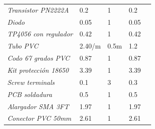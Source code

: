\documentclass[12pt]{article}
\begin{document}
\begin{table}[h!]
\begin{tabular}{l|l|l|l|l}
			\multicolumn{1}{|l|}{\textit{Transistor PN2222A}}               & 0.2                                                  & 1                                      & 0.2                                             &  \\ \cline{1-4}
			\multicolumn{1}{|l|}{\textit{Diodo}}                            & 0.05                                                 & 1                                      & 0.05                                            &  \\ \cline{1-4}
			\multicolumn{1}{|l|}{\textit{TP4056 con regulador}}             & 0.42                                                 & 1                                      & 0.42                                            &  \\ \cline{1-4}
			\multicolumn{1}{|l|}{\textit{Tubo PVC}}                         & 2.40/m                                               & 0.5m                                   & 1.2                                             &  \\ \cline{1-4}
			\multicolumn{1}{|l|}{\textit{Codo 67 grados PVC}}               & 0.87                                                 & 1                                      & 0.87                                            &  \\ \cline{1-4}
			\multicolumn{1}{|l|}{\textit{Kit protección 18650}}             & 3.39                                                 & 1                                      & 3.39                                            &  \\ \cline{1-4}
			\multicolumn{1}{|l|}{\textit{Screw terminals}}                  & 0.1                                                  & 3                                      & 0.3                                             &  \\ \cline{1-4}
			\multicolumn{1}{|l|}{\textit{PCB soldadura}}                    & 0.5                                                  & 1                                      & 0.5                                             &  \\ \cline{1-4}
			\multicolumn{1}{|l|}{\textit{Alargador SMA 3FT}}                & 1.97                                                 & 1                                      & 1.97                                            &  \\ \cline{1-4}
			\multicolumn{1}{|l|}{\textit{Conector PVC 50mm}}                & 2.61                                                 & 1                                      & 2.61                                            &  \\ \cline{1-4}

\end{tabular}
\end{table}
\end{document}
